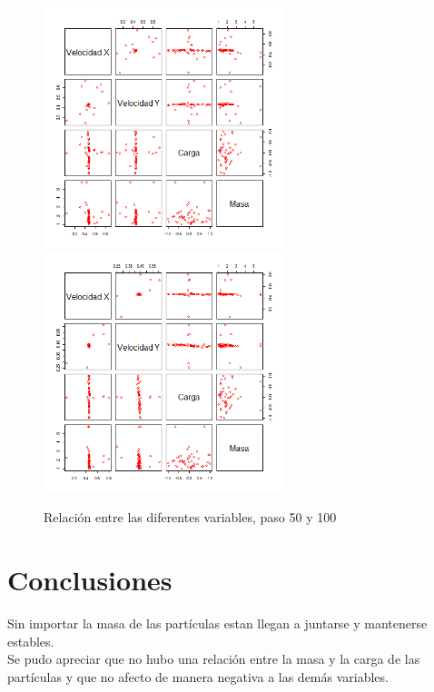 \documentclass{article}
\begin{document}
\begin{figure}[H]
\centering
\includegraphics[width=7cm]{relacion_para_atraccion050.png} \includegraphics[width=7cm]{relacion_para_atraccion100.png}
\caption{Relación entre las diferentes variables, paso 50 y 100}
\end{figure}


\section{Conclusiones}
Sin importar la masa de las partículas estan llegan a juntarse y mantenerse estables.\\
Se pudo apreciar que no hubo una relación entre la masa y la carga de las partículas y que no afecto de manera negativa a las demás variables.



\end{document}
